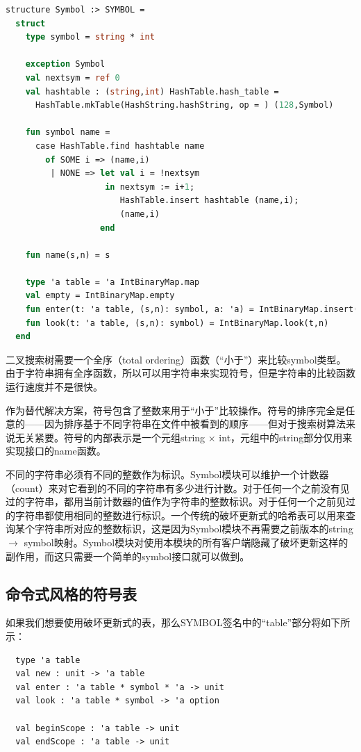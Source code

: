 \documentclass[cn,11pt,chinese]{elegantbook}
\begin{document}
\begin{lstlisting}[language=ml,caption={符号表的实现。HashTable和IntBinaryMap来自\textit{Standard ML of New Jersey Library}},label={code:5-6}]
  structure Symbol :> SYMBOL =
  struct
    type symbol = string * int

    exception Symbol
    val nextsym = ref 0
    val hashtable : (string,int) HashTable.hash_table =
      HashTable.mkTable(HashString.hashString, op = ) (128,Symbol)

    fun symbol name =
      case HashTable.find hashtable name
        of SOME i => (name,i)
         | NONE => let val i = !nextsym
                    in nextsym := i+1;
                       HashTable.insert hashtable (name,i);
                       (name,i)
                   end

    fun name(s,n) = s

    type 'a table = 'a IntBinaryMap.map
    val empty = IntBinaryMap.empty
    fun enter(t: 'a table, (s,n): symbol, a: 'a) = IntBinaryMap.insert(t,n,a)
    fun look(t: 'a table, (s,n): symbol) = IntBinaryMap.look(t,n)
  end
\end{lstlisting}

二叉搜索树需要一个全序（total ordering）函数（“小于”）来比较symbol类型。由于字符串拥有全序函数，所以可以用字符串来实现符号，但是字符串的比较函数运行速度并不是很快。

作为替代解决方案，符号包含了整数来用于“小于”比较操作。符号的排序完全是任意的——因为排序基于不同字符串在文件中被看到的顺序——但对于搜索树算法来说无关紧要。符号的内部表示是一个元组string $\times$ int，元组中的string部分仅用来实现接口的name函数。

不同的字符串必须有不同的整数作为标识。Symbol模块可以维护一个计数器（count）来对它看到的不同的字符串有多少进行计数。对于任何一个之前没有见过的字符串，都用当前计数器的值作为字符串的整数标识。对于任何一个之前见过的字符串都使用相同的整数进行标识。一个传统的破坏更新式的哈希表可以用来查询某个字符串所对应的整数标识，这是因为Symbol模块不再需要之前版本的string $\rightarrow$ symbol映射。Symbol模块对使用本模块的所有客户端隐藏了破坏更新这样的副作用，而这只需要一个简单的symbol接口就可以做到。

\subsection{命令式风格的符号表}

如果我们想要使用破坏更新式的表，那么SYMBOL签名中的“table”部分将如下所示：

\begin{lstlisting}
  type 'a table
  val new : unit -> 'a table
  val enter : 'a table * symbol * 'a -> unit
  val look : 'a table * symbol -> 'a option

  val beginScope : 'a table -> unit
  val endScope : 'a table -> unit
\end{lstlisting}
\end{document}
